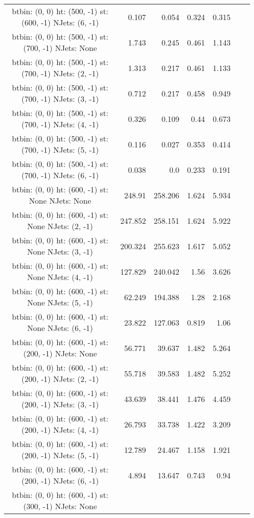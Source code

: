 \documentclass[12pt]{paper}
\begin{document}
\begin{landscape}
\begin{longtable}{c|r|r|r|r|r|r}
btbin:  (0, 0) ht:  (500, -1) st:  (600, -1) NJets:  (6, -1)
 & 0.107 & 0.054 & 0.324 & 0.315\\
btbin:  (0, 0) ht:  (500, -1) st:  (700, -1) NJets:  None
 & 1.743 & 0.245 & 0.461 & 1.143\\
btbin:  (0, 0) ht:  (500, -1) st:  (700, -1) NJets:  (2, -1)
 & 1.313 & 0.217 & 0.461 & 1.133\\
btbin:  (0, 0) ht:  (500, -1) st:  (700, -1) NJets:  (3, -1)
 & 0.712 & 0.217 & 0.458 & 0.949\\
btbin:  (0, 0) ht:  (500, -1) st:  (700, -1) NJets:  (4, -1)
 & 0.326 & 0.109 & 0.44 & 0.673\\
btbin:  (0, 0) ht:  (500, -1) st:  (700, -1) NJets:  (5, -1)
 & 0.116 & 0.027 & 0.353 & 0.414\\
btbin:  (0, 0) ht:  (500, -1) st:  (700, -1) NJets:  (6, -1)
 & 0.038 & 0.0 & 0.233 & 0.191\\
btbin:  (0, 0) ht:  (600, -1) st:  None NJets:  None
 & 248.91 & 258.206 & 1.624 & 5.934\\
btbin:  (0, 0) ht:  (600, -1) st:  None NJets:  (2, -1)
 & 247.852 & 258.151 & 1.624 & 5.922\\
btbin:  (0, 0) ht:  (600, -1) st:  None NJets:  (3, -1)
 & 200.324 & 255.623 & 1.617 & 5.052\\
btbin:  (0, 0) ht:  (600, -1) st:  None NJets:  (4, -1)
 & 127.829 & 240.042 & 1.56 & 3.626\\
btbin:  (0, 0) ht:  (600, -1) st:  None NJets:  (5, -1)
 & 62.249 & 194.388 & 1.28 & 2.168\\
btbin:  (0, 0) ht:  (600, -1) st:  None NJets:  (6, -1)
 & 23.822 & 127.063 & 0.819 & 1.06\\
btbin:  (0, 0) ht:  (600, -1) st:  (200, -1) NJets:  None
 & 56.771 & 39.637 & 1.482 & 5.264\\
btbin:  (0, 0) ht:  (600, -1) st:  (200, -1) NJets:  (2, -1)
 & 55.718 & 39.583 & 1.482 & 5.252\\
btbin:  (0, 0) ht:  (600, -1) st:  (200, -1) NJets:  (3, -1)
 & 43.639 & 38.441 & 1.476 & 4.459\\
btbin:  (0, 0) ht:  (600, -1) st:  (200, -1) NJets:  (4, -1)
 & 26.793 & 33.738 & 1.422 & 3.209\\
btbin:  (0, 0) ht:  (600, -1) st:  (200, -1) NJets:  (5, -1)
 & 12.789 & 24.467 & 1.158 & 1.921\\
btbin:  (0, 0) ht:  (600, -1) st:  (200, -1) NJets:  (6, -1)
 & 4.894 & 13.647 & 0.743 & 0.94\\
btbin:  (0, 0) ht:  (600, -1) st:  (300, -1) NJets:  None

\end{longtable}
\end{landscape}
\end{document}
